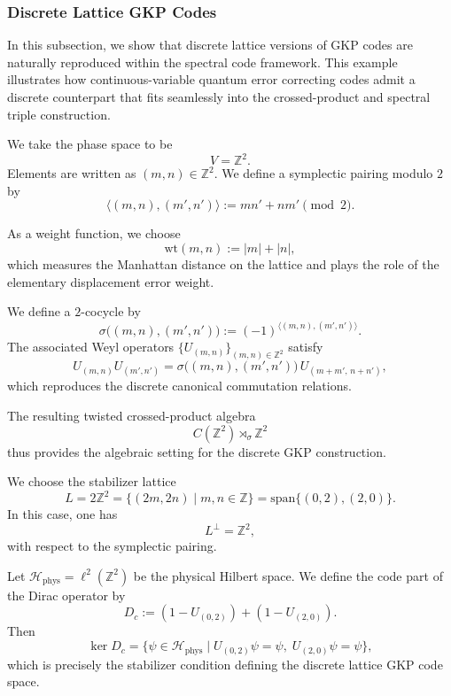 \documentclass[12pt]{article}
\theoremstyle{definition} %
\theoremstyle{plain} %
\theoremstyle{remark} %
\theoremstyle{underline}
\begin{document}
\subsubsection{Discrete Lattice GKP Codes}

In this subsection, we show that discrete lattice versions of GKP codes are naturally reproduced within the spectral code framework.
This example illustrates how continuous-variable quantum error correcting codes admit a discrete counterpart that fits seamlessly into the crossed-product and spectral triple construction.

We take the phase space to be
\[
    V=\mathbb{Z}^2.
\]
Elements are written as $(m,n)\in\mathbb{Z}^2$. We define a symplectic pairing modulo $2$ by
\[
    \langle (m,n),(m',n')\rangle
    := mn' + nm' \pmod{2}.
\]

As a weight function, we choose
\[
    \mathrm{wt}(m,n):=|m|+|n|,
\]
which measures the Manhattan distance on the lattice and plays the role of the elementary displacement error weight.

We define a $2$-cocycle by
\[
    \sigma\bigl((m,n),(m',n')\bigr)
    := (-1)^{\langle (m,n),(m',n')\rangle}.
\]
The associated Weyl operators $\{U_{(m,n)}\}_{(m,n)\in\mathbb{Z}^2}$ satisfy
\[
    U_{(m,n)}U_{(m',n')}
    =
    \sigma\bigl((m,n),(m',n')\bigr)\,
    U_{(m+m',\,n+n')},
\]
which reproduces the discrete canonical commutation relations.

The resulting twisted crossed-product algebra
\[
    C(\mathbb{Z}^2)\rtimes_\sigma \mathbb{Z}^2
\]
thus provides the algebraic setting for the discrete GKP construction.

We choose the stabilizer lattice
\[
    L = 2\mathbb{Z}^2
    = \{(2m,2n)\mid m,n\in\mathbb{Z}\}
    = \mathrm{span}\{(0,2),(2,0)\}.
\]
In this case, one has
\[
    L^\perp = \mathbb{Z}^2,
\]
with respect to the symplectic pairing.

Let $\mathcal{H}_{\mathrm{phys}}=\ell^2(\mathbb{Z}^2)$ be the physical Hilbert space.
We define the code part of the Dirac operator by
\[
    D_c := (1-U_{(0,2)}) + (1-U_{(2,0)}).
\]
Then
\[
    \ker D_c
    =
    \{\psi\in\mathcal{H}_{\mathrm{phys}}
    \mid
    U_{(0,2)}\psi=\psi,\;
    U_{(2,0)}\psi=\psi
    \},
\]
which is precisely the stabilizer condition defining the discrete lattice GKP
code space.
\end{document}
